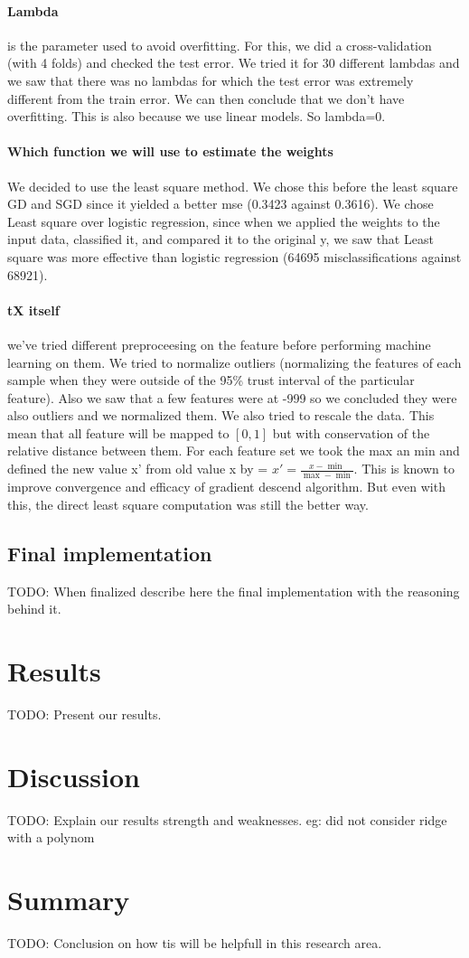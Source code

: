 \documentclass[10pt,conference,compsocconf]{IEEEtran}
\begin{document}
\paragraph{Lambda} is the parameter used to avoid overfitting. For this, we did a cross-validation (with 4 folds) and checked the test error. We tried it for 30 different lambdas and we saw that there was no lambdas for which the test error was extremely different from the train error. We can then conclude that we don’t have overfitting. This is also because we use linear models. So lambda=0.
\paragraph{Which function we will use to estimate the weights} We decided to use the least square method. We chose this before the least square GD and SGD since it yielded a better mse (0.3423 against 0.3616). We chose Least square over logistic regression, since when we applied the weights to the input data, classified it, and compared it to the original y, we saw that Least square was more effective than logistic regression (64695 misclassifications against 68921).
\paragraph{tX itself} we've tried different preproceesing on the feature before performing machine learning on them. We tried to normalize outliers (normalizing the features of each sample when they were outside of the 95\% trust interval of the particular feature). Also we saw that a few features were at -999 so we concluded they were also outliers and we normalized them.
We also tried to rescale the data. This mean that all feature will be  mapped to \( [0,1] \) but with conservation of the relative distance between them. For each feature set we took the max an min and defined the new value x' from old value x by = \( x' = \frac{x-\min}{\max - \min }\). This is known to improve convergence and efficacy of gradient descend algorithm. But even with this, the direct least square computation was still the better way.
\subsection{Final implementation}

TODO: When finalized describe here the final implementation with the reasoning behind it.

\section{Results}
TODO: Present our results.

\section{Discussion}
TODO: Explain our results strength and weaknesses.
eg: did not consider ridge with a polynom

\section{Summary}
TODO: Conclusion on how tis will be helpfull in this research area.



\end{document}
